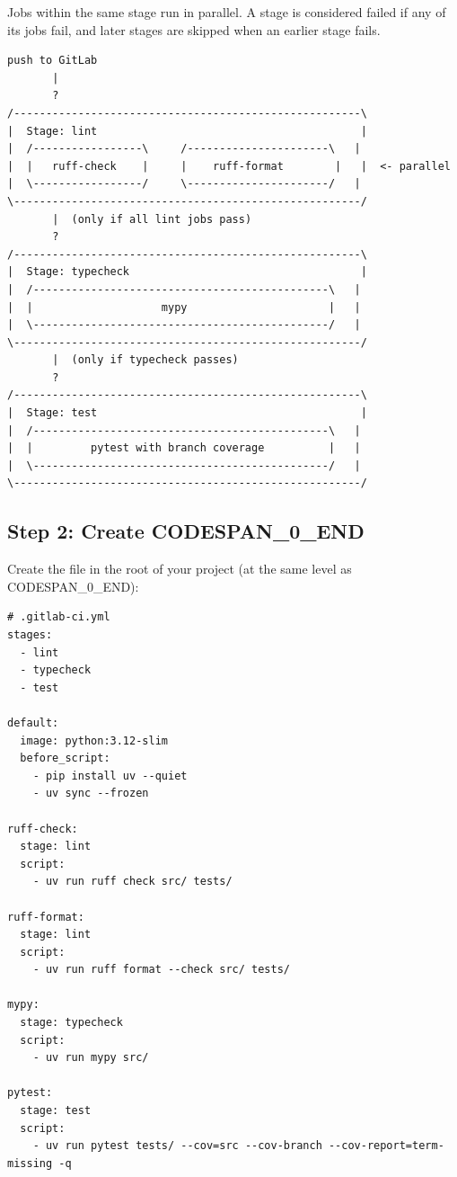 \documentclass[11pt,a4paper]{book}
\begin{document}
Jobs within the same stage run in parallel. A stage is considered failed if any of its jobs fail, and later stages are skipped when an earlier stage fails.

\begin{lstlisting}
push to GitLab
       |
       ?
/------------------------------------------------------\
|  Stage: lint                                         |
|  /-----------------\     /----------------------\   |
|  |   ruff-check    |     |    ruff-format        |   |  <- parallel
|  \-----------------/     \----------------------/   |
\------------------------------------------------------/
       |  (only if all lint jobs pass)
       ?
/------------------------------------------------------\
|  Stage: typecheck                                    |
|  /----------------------------------------------\   |
|  |                    mypy                      |   |
|  \----------------------------------------------/   |
\------------------------------------------------------/
       |  (only if typecheck passes)
       ?
/------------------------------------------------------\
|  Stage: test                                         |
|  /----------------------------------------------\   |
|  |         pytest with branch coverage          |   |
|  \----------------------------------------------/   |
\------------------------------------------------------/
\end{lstlisting}

\medskip

\subsection{Step 2: Create CODESPAN\_0\_END}

Create the file in the root of your project (at the same level as CODESPAN\_0\_END):

\begin{lstlisting}
# .gitlab-ci.yml
stages:
  - lint
  - typecheck
  - test

default:
  image: python:3.12-slim
  before_script:
    - pip install uv --quiet
    - uv sync --frozen

ruff-check:
  stage: lint
  script:
    - uv run ruff check src/ tests/

ruff-format:
  stage: lint
  script:
    - uv run ruff format --check src/ tests/

mypy:
  stage: typecheck
  script:
    - uv run mypy src/

pytest:
  stage: test
  script:
    - uv run pytest tests/ --cov=src --cov-branch --cov-report=term-missing -q
\end{lstlisting}
\end{document}
